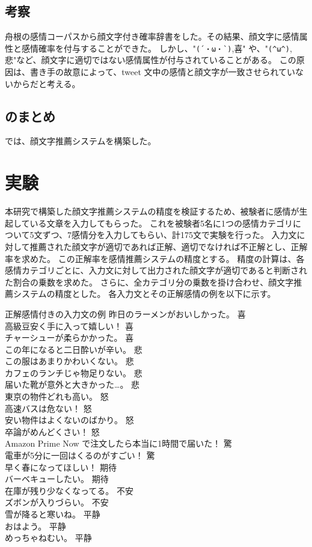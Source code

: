 \documentclass[11pt,a4j]{jsarticle}
\begin{document}
  \subsection{考察}
舟根の感情コーパスから顔文字付き確率辞書をした。その結果、顔文字に感情属性と感情確率を付与することができた。
しかし、"\verb|(´・ω・`)|,喜" や、"\verb|(^ω^)|,悲"など、顔文字に適切ではない感情属性が付与されていることがある。
この原因は、書き手の故意によって、tweet 文中の感情と顔文字が一致させられていないからだと考える。

  \subsection{ のまとめ}
では、顔文字推薦システムを構築した。

\section{実験}\label{sec:experiment}
本研究で構築した顔文字推薦システムの精度を検証するため、被験者に感情が生起している文章を入力してもらった。
これを被験者5名に1つの感情カテゴリについて5文ずつ、7感情分を入力してもらい、計175文で実験を行った。
入力文に対して推薦された顔文字が適切であれば正解、適切でなければ不正解とし、正解率を求めた。
この正解率を感情推薦システムの精度とする。
精度の計算は、各感情カテゴリごとに、入力文に対して出力された顔文字が適切であると判断された割合の乗数を求めた。
さらに、全カテゴリ分の乗数を掛け合わせ、顔文字推薦システムの精度とした。
各入力文とその正解感情の例を以下に示す。

\begin{itembox}[l]{正解感情付きの入力文の例}
昨日のラーメンがおいしかった。 喜 \\
高級豆安く手に入って嬉しい！ 喜\\
チャーシューが柔らかかった。 喜\\
この年になると二日酔いが辛い。 悲\\
この服はあまりかわいくない。 悲\\
カフェのランチじゃ物足りない。 悲\\
届いた靴が意外と大きかった…。 悲\\
東京の物件どれも高い。 怒\\
高速バスは危ない！ 怒\\
安い物件はよくないのばかり。 怒\\
卒論がめんどくさい！ 怒\\
Amazon Prime Now で注文したら本当に1時間で届いた！ 驚\\
電車が5分に一回はくるのがすごい！ 驚\\
早く春になってほしい！ 期待\\
バーベキューしたい。 期待\\
在庫が残り少なくなってる。 不安\\
ズボンが入りづらい。 不安\\
雪が降ると寒いね。 平静\\
おはよう。 平静\\
めっちゃねむい。 平静\\
\end{itembox}
\end{document}
